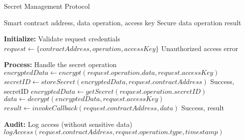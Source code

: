 
\begin{algorithm}
\caption{Secret Management Protocol}
\label{alg:secret}
\begin{algorithmic}[1]
\Require Smart contract address, data operation, access key
\Ensure Secure data operation result

\State \textbf{Initialize:} Validate request credentials
\State $request \gets \{contractAddress, operation, accessKey\}$
    \State \Return Unauthorized access error
\EndIf

\State \textbf{Process:} Handle the secret operation
    \State $encryptedData \gets encrypt(request.operation.data, request.accessKey)$
    \State $secretID \gets storeSecret(encryptedData, request.contractAddress)$
    \State \Return Success, secretID
    \State $encryptedData \gets getSecret(request.operation.secretID)$
    \State $data \gets decrypt(encryptedData, request.accessKey)$
    \State $result \gets invokeCallback(request.contractAddress, data)$
    \State \Return Success, result
\EndIf

\State \textbf{Audit:} Log access (without sensitive data)
\State $logAccess(request.contractAddress, request.operation.type, timestamp)$
\end{algorithmic}
\end{algorithm} 